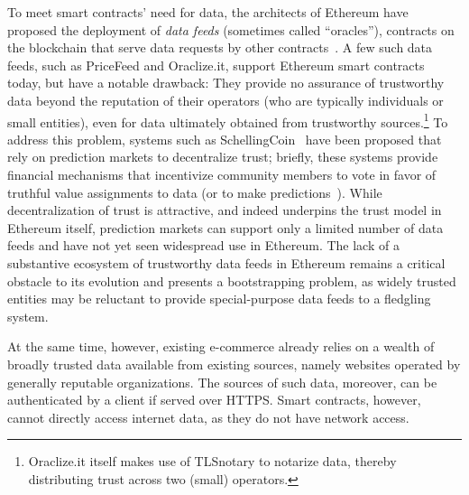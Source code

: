 To meet smart contracts' need for data, the architects of Ethereum have proposed the deployment of \emph{data feeds} (sometimes called ``oracles''), contracts on the blockchain that serve data requests by other contracts~\cite{whitepaper,yellowpaper}. A few such data feeds, such as PriceFeed and Oraclize.it, support Ethereum smart contracts today, but have a notable drawback: They provide no assurance of trustworthy data beyond the reputation of their operators (who are typically individuals or small entities), even for data ultimately obtained from trustworthy sources.\footnote{Oraclize.it itself makes use of TLSnotary to notarize data, thereby distributing trust across two (small) operators.} To address this problem, systems such as SchellingCoin~\cite{} have been proposed that rely on prediction markets to decentralize trust; briefly, these systems provide financial mechanisms that incentivize community members to vote in favor of truthful value assignments to data (or to make predictions~\cite{Augur}). While decentralization of trust is attractive, and indeed underpins the trust model in Ethereum itself, prediction markets can support only a limited number of data feeds and have not yet seen widespread use in Ethereum. The lack of a substantive ecosystem of trustworthy data feeds in Ethereum remains a critical obstacle to its evolution and presents a bootstrapping problem, as widely trusted entities may be reluctant to provide special-purpose data feeds to a fledgling system.

At the same time, however, existing e-commerce already relies on a wealth of broadly trusted data available from existing sources, namely websites operated by generally reputable organizations. The sources of such data, moreover, can be authenticated by a client if served over HTTPS. Smart contracts, however, cannot directly access internet data, as they do not have network access.


